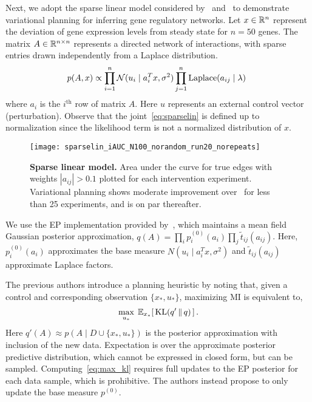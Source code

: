 Next, we adopt the sparse linear model considered
by~\cite{steinke2007experimental} and~\cite{seeger2008bayesian} to
demonstrate variational planning for inferring gene regulatory
networks.  Let $x\in\mathbb{R}^n$ represent the deviation of gene expression
levels from steady state for $n=50$ genes.  The matrix
$A\in\mathbb{R}^{n\times n}$ represents a directed network of interactions,
with sparse entries drawn independently from a Laplace distribution.
\begin{equation}\label{eq:sparselin}
  \!\!\!p(A,x) \propto \prod_{i=1}^n \mathcal{N}(u_i \mid a_i^T
    x, \sigma^2) \prod_{j=1}^n \textrm{Laplace}(a_{ij} \mid \lambda) 
\end{equation}
where $a_i$ is the $i^{\text{th}}$ row of matrix $A$.  Here $u$
represents an external control vector (perturbation). Observe that the
joint~\eqref{eq:sparselin} is defined up to normalization since the
likelihood term is not a normalized distribution of $x$.

\begin{figure}
  \centering
  \texttt{[image: sparselin\_iAUC\_N100\_norandom\_run20\_norepeats]}
  \caption{\small\textbf{Sparse linear model.} Area under the curve
  for true edges with weights $|a_{ij}|>0.1$ plotted for each
  intervention experiment.  Variational planning shows moderate
  improvement over~\citep{seeger2008bayesian} for less than 25
  experiments, and is on par thereafter.}
  \label{fig:sparselin}
\end{figure}

We use the EP implementation provided by~\cite{seeger2008bayesian},
which maintains a mean field Gaussian posterior
approximation, \mbox{$q(A) = \prod_i
p_i^{(0)}(a_i) \prod_j \widetilde{t}_{ij}(a_{ij})$}.  Here,
$p^{(0)}_i(a_i)$ approximates the base measure \mbox{$N(u_i \mid a_i^T
x, \sigma^2)$} and \mbox{$\widetilde{t}_{ij}(a_{ij})$} approximate Laplace
factors.

The previous authors introduce a planning heuristic by noting that,
given a control and corresponding observation $\{x_*,u_*\}$,
maximizing MI is equivalent to,
\begin{equation}\label{eq:max_kl}
  \max_{u_*} \; \mathbb{E}_{x_*}\!\left[\, \mathrm{KL}(q'\,\|\,q) \,\right].
\end{equation}
Here $q'(A) \approx p(A \mid D \cup \{x_*,u_*\})$ is the posterior
approximation with inclusion of the new data.  Expectation is over the
approximate posterior predictive distribution, which cannot be
expressed in closed form, but can be sampled.
Computing~\eqref{eq:max_kl} requires full updates to the EP posterior
for each data sample, which is prohibitive.  The authors instead
propose to only update the base measure $p^{(0)}$.

